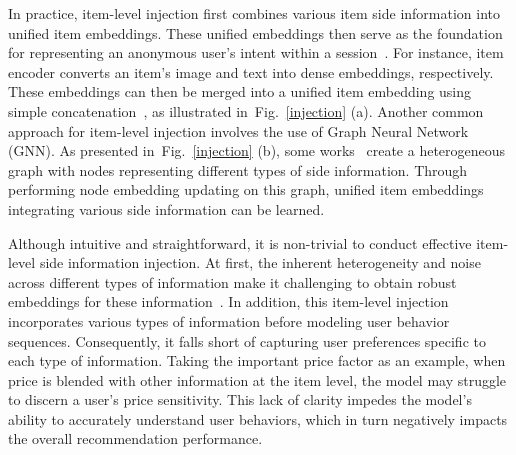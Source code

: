 \documentclass[lettersize,journal]{IEEEtran}
\newcommand{\fig}{Fig.\xspace}
\begin{document}
In practice, item-level injection first combines various item side information into unified item embeddings. These unified embeddings then serve as the foundation for representing an anonymous user's intent within a session~\cite{lai@SIGIR2022,Hu@CIKM2023,liu@AAAI2021,Liu@RecSys2023}. For instance, item encoder converts an item's image and text into dense embeddings, respectively. These embeddings can then be merged into a unified item embedding using simple concatenation~\cite{FGNN,Shalaby@RecSys2022,lai@SIGIR2022,liu@WWW2020}, as illustrated in~\fig~\ref{injection} (a). Another common approach for item-level injection involves the use of Graph Neural Network (GNN). As presented in~\fig~\ref{injection} (b), some works~\cite{CoHHN,Yuan@ICDE2022,BiPNet,Wu@ICDE2023} create a heterogeneous graph with nodes representing different types of side information. Through performing node embedding updating on this graph, unified item embeddings integrating various side information can be learned. 

Although intuitive and straightforward, it is non-trivial to conduct effective item-level side information injection. At first, the inherent heterogeneity and noise across different types of information make it challenging to obtain robust embeddings for these information~\cite{MMSBR,Tadas@TPAMI2019, bottleneck}. In addition, this item-level injection incorporates various types of information before modeling user behavior sequences. Consequently, it falls short of capturing user preferences specific to each type of information. Taking the important price factor as an example, when price is blended with other information at the item level, the model may struggle to discern a user's price sensitivity. This lack of clarity impedes the model's ability to accurately understand user behaviors, which in turn negatively impacts the overall recommendation performance.

\end{document}
